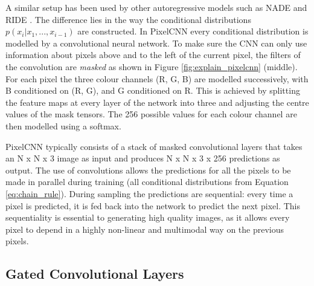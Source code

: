 \documentclass{article}
\begin{document}
A similar setup has been used by other autoregressive models such as NADE \cite{larochelle2011} and RIDE \cite{theis2015generative}. The difference lies in the way the conditional distributions $p(x_i | x_1,...,x_{i-1})$ are constructed. In PixelCNN every conditional distribution is modelled by a convolutional neural network. To make sure the CNN can only use information about pixels above and to the left of the current pixel, the filters of the convolution are \emph{masked} as shown in Figure \ref{fig:explain_pixelcnn} (middle). For each pixel the three colour channels (R, G, B) are modelled successively, with B conditioned on (R, G), and G conditioned on R. This is achieved by splitting the feature maps at every layer of the network into three and adjusting the centre values of the mask tensors. The 256 possible values for each colour channel are then modelled using a softmax.

PixelCNN typically consists of a stack of masked convolutional layers that takes an N x N x 3 image as input and produces N x N x 3 x 256 predictions as output. The use of convolutions allows the predictions for all the pixels to be made in parallel during training (all conditional distributions from Equation \ref{eq:chain_rule}). During sampling the predictions are sequential: every time a pixel is predicted, it is fed back into the network to predict the next pixel. This sequentiality is essential to generating high quality images, as it allows every pixel to depend in a highly non-linear and multimodal way on the previous pixels.

\subsection{Gated Convolutional Layers}
 
\end{document}
